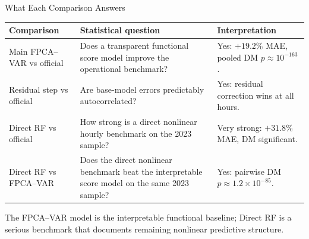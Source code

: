 \documentclass[10pt,aspectratio=169]{beamer}
\newcommand{\claim}[1]{\vspace{0.15em}{\small\textbf{#1}}\vspace{0.35em}}
\begin{document}
\begin{frame}{What Each Comparison Answers}
  \small
  \begin{tabular}{p{}p{}p{}}
    \toprule
    Comparison & Statistical question & Interpretation \\
    \midrule
    Main FPCA--VAR vs official &
    Does a transparent functional score model improve the operational benchmark? &
    Yes: $+19.2\%$ MAE, pooled DM $p\approx10^{-163}$. \\
    \addlinespace
    Residual step vs official &
    Are base-model errors predictably autocorrelated? &
    Yes: residual correction wins at all hours. \\
    \addlinespace
    Direct RF vs official &
    How strong is a direct nonlinear hourly benchmark on the 2023 sample? &
    Very strong: $+31.8\%$ MAE, DM significant. \\
    \addlinespace
    Direct RF vs FPCA--VAR &
    Does the direct nonlinear benchmark beat the interpretable score model on the same 2023 sample? &
    Yes: pairwise DM $p\approx1.2\times10^{-85}$. \\
    \bottomrule
  \end{tabular}
  \vspace{0.8em}

  \claim{Thesis position}
  The FPCA--VAR model is the interpretable functional baseline; Direct RF is a
  serious benchmark that documents remaining nonlinear predictive structure.
\end{frame}
\end{document}
